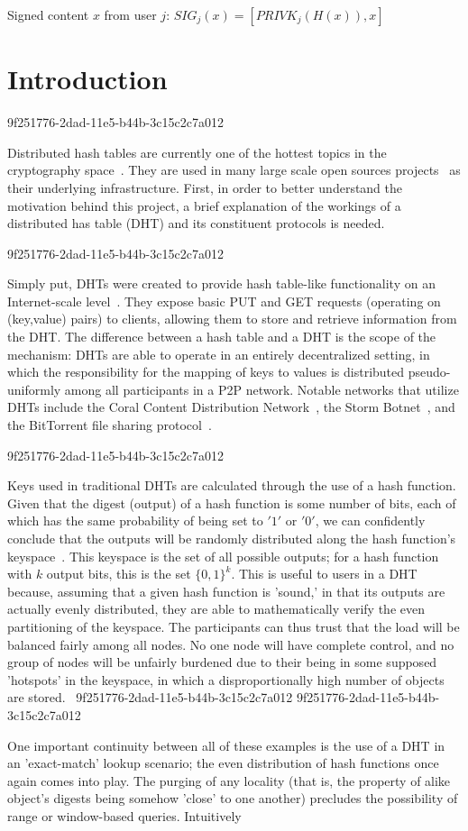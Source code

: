 \documentclass[12pt]{article}
\begin{document}
Signed content $x$ from user $j$: $SIG_j(x) = \left[ PRIVK_j( H(x) ), x \right]$

\section{Introduction}
9f251776-2dad-11e5-b44b-3c15c2c7a012\par Distributed hash tables are currently one of the hottest topics in the cryptography space~\cite{Stoica:2001dj,Rowstron:2001ea,Ratnasamy:2001wn}. They are used in many large scale open sources projects~\cite{Freitas:2013tb,Xu:2010vs,Perfitt:2010fh} as their underlying infrastructure. First, in order to better understand the motivation behind this project, a brief explanation of the workings of a distributed has table (DHT) and its constituent protocols is needed.

9f251776-2dad-11e5-b44b-3c15c2c7a012\par Simply put, DHTs were created to provide hash table-like functionality on an Internet-scale level~\cite{Ratnasamy:2001wn}. They expose basic PUT and GET requests (operating on (key,value) pairs) to clients, allowing them to store and retrieve information from the DHT. The difference between a hash table and a DHT is the scope of the mechanism: DHTs are able to operate in an entirely decentralized setting, in which the responsibility for the mapping of keys to values is distributed pseudo-uniformly among all participants in a P2P network. Notable networks that utilize DHTs include the Coral Content Distribution Network~\cite{Freedman:2004vb}, the Storm Botnet~\cite{Holz:2008uk}, and the BitTorrent file sharing protocol~\cite{Cohen:y1_8mBnw}.

9f251776-2dad-11e5-b44b-3c15c2c7a012\par Keys used in traditional DHTs are calculated through the use of a hash function. Given that the digest (output) of a hash function is some number of bits, each of which has the same probability of being set to $'1'$ or $'0'$, we can confidently conclude that the outputs will be randomly distributed along the hash function's keyspace~. This keyspace is the set of all possible outputs; for a hash function with $k$ output bits, this is the set $\{0,1\}^k$. This is useful to users in a DHT because, assuming that a given hash function is 'sound,' in that its outputs are actually evenly distributed, they are able to mathematically verify the even partitioning of the keyspace. The participants can thus trust that the load will be balanced fairly among all nodes. No one node will have complete control, and no group of nodes will be unfairly burdened due to their being in some supposed 'hotspots' in the keyspace, in which a disproportionally high number of objects are stored.~
9f251776-2dad-11e5-b44b-3c15c2c7a012
9f251776-2dad-11e5-b44b-3c15c2c7a012\par One important continuity between all of these examples is the use of a DHT in an 'exact-match' lookup scenario; the even distribution of hash functions once again comes into play. The purging of any locality (that is, the property of alike object's digests being somehow 'close' to one another) precludes the possibility of range or window-based queries. Intuitively
\end{document}
